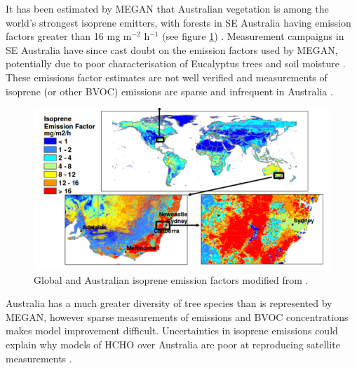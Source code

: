     It has been estimated by MEGAN that Australian vegetation is among the world's strongest isoprene emitters, with forests in SE Australia having emission factors greater than 16 mg m$^{-2}$ h$^{-1}$ (see figure \ref{LR:Aus:fig_MEGAN_EF}) \parencite{Guenther2006, Guenther2012}.
    Measurement campaigns in SE Australia have since cast doubt on the emission factors used by MEGAN, potentially due to poor characterisation of Eucalyptus trees and soil moisture \parencite{Emmerson2016, Emmerson2019}.
    These emissions factor estimates are not well verified and measurements of isoprene (or other BVOC) emissions are sparse and infrequent in Australia \parencite{Sindelarova2014, Bauwens2016}.
    
    \begin{figure}
      \includegraphics[width=\textwidth]{Figures/MeganIsoprene1_final.png}
      \caption{Global and Australian isoprene emission factors modified from \textcite{Guenther2006}.}
      \label{LR:Aus:fig_MEGAN_EF}
    \end{figure}
    
    
    Australia has a much greater diversity of tree species than is represented by MEGAN, however sparse measurements of emissions and BVOC concentrations makes model improvement difficult.
    Uncertainties in isoprene emissions could explain why models of HCHO over Australia are poor at reproducing satellite measurements \parencite{Stavrakou2009}.
    
